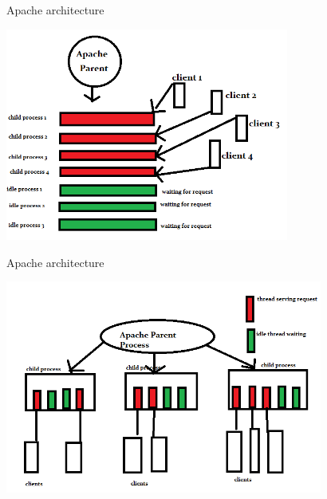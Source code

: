 \begin{frame}{Apache architecture}
  \begin{center}
    \includegraphics[height=7cm,keepaspectratio]{sources/images/prefork_model.png}
  \end{center}
\end{frame}
\begin{frame}{Apache architecture}
  \begin{center}
    \includegraphics[height=7cm,keepaspectratio]{sources/images/apache_worker.png}
  \end{center}
\end{frame}